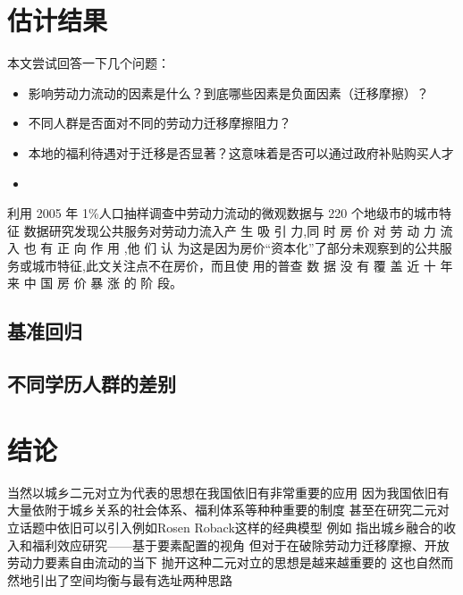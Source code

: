 \documentclass[a4paper,12pt,oneside]{book} %
\begin{document}
\chapter{估计结果}

本文尝试回答一下几个问题：
\begin{itemize}
  \item 影响劳动力流动的因素是什么？到底哪些因素是负面因素（迁移摩擦）？
  \item 不同人群是否面对不同的劳动力迁移摩擦阻力？
  \item 本地的福利待遇对于迁移是否显著？这意味着是否可以通过政府补贴购买人才
  \item 
\end{itemize}


\cite{XiaYiRanChengShiJianDeMengMuSanQianGongGongFuWuYingXiangLaoDongLiLiuXiangDeJingYanYanJiu2015} 利用 2005 年 1\%人口抽样调查中劳动力流动的微观数据与 220 个地级市的城市特征 数据研究发现公共服务对劳动力流入产 生 吸 引 力,同 时 房 价 对 劳 动 力 流 入 也 有 正 向 作 用 ,他 们 认 为这是因为房价“资本化”了部分未观察到的公共服务或城市特征,此文关注点不在房价，而且使 用的普查 数 据 没 有 覆 盖 近 十 年 来 中 国 房 价 暴 涨 的 阶 段。

\section{基准回归} %
\label{sub:基准回归}



\section{不同学历人群的差别} %
\label{sub:不同学历人群的差别}




\chapter{结论}
当然以城乡二元对立为代表的思想在我国依旧有非常重要的应用 因为我国依旧有大量依附于城乡关系的社会体系、福利体系等种种重要的制度
甚至在研究二元对立话题中依旧可以引入例如Rosen Roback这样的经典模型
例如 
\cite{GuoDongMeiChengXiangRongHeDeShouRuHeFuLiXiaoYingYanJiuJiYuYaoSuPeiZhiDeShiJiao2023}指出城乡融合的收入和福利效应研究——基于要素配置的视角
但对于在破除劳动力迁移摩擦、开放劳动力要素自由流动的当下
抛开这种二元对立的思想是越来越重要的
这也自然而然地引出了空间均衡与最有选址两种思路
\end{document}
